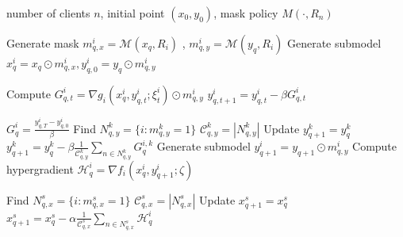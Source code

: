 \documentclass[lettersize,journal]{IEEEtran}
\begin{document}
\begin{algorithm}[t]
  \caption{Recourse-Adaptive Distributed Stochastic Bilevel Optimization(RABO)}
  \label{alg:rabo} 
  \begin{algorithmic}[1]
     number of clients $n$, initial point $(x_0, y_0)$, mask policy ${M}(\cdot, R_n)$

    \STATE \begin{small}Generate mask $ m^i_{q,x}=\mathcal{M}(x_{q},R_i)$ , $m^i_{q,y}=\mathcal{M}(y_{q}, R_i)$
    \STATE Generate submodel $ x^i_{q}=x_{q}\odot m^i_{q,x}, y^i_{q,0}=y_{q}\odot m^i_{q,y}$\end{small}

    \STATE Compute $G_{q,t}^i=\nabla g_i(x^i_{q}, y^i_{q,t};\xi_{t}^{i})\odot m^i_{q,y}$
    \STATE $y^i_{q,t+1}=y^i_{q,t}-\beta G_{q,t}^i$
    \ENDFOR
    
    \STATE $G_{q}^i=\frac{y^i_{q,T}-y^i_{q,0}}{\beta}$
    \ENDFOR
    \STATE Find $N_{q,y}^{k}=\{i:m_{q,y}^k=1\}$
    \STATE $\mathcal{C}_{q,y}^{k}=|N_{q,y}^{k}|$
    \STATE Update $y_{q+1}^k= y_{q}^k$
    \ELSE
    \STATE $y_{q+1}^k = y_{q}^k-\beta\frac{1}{\mathcal{C}_{q,y}^{k}} \sum_{n\in N_{q,y}^{k}}G_{q}^{i,k}$
    \ENDIF
    \ENDFOR
    \STATE Generate submodel $y^i_{q+1}=y_{q+1}\odot m^i_{q,y}$
    \STATE \colorbox{cyan!30}{Compute hypergradient $\mathcal{H}_q^i=\nabla f_i(x_q^i, y_{q+1}^i;\zeta)$}
    
    \ENDFOR
    \STATE Find $N_{q,x}^{s}=\{i:m_{q,x}^s=1\}$
    \STATE $\mathcal{C}_{q,x}^{s}=|N_{q,x}^{s}|$
    \STATE Update $x_{q+1}^s= x_{q}^s$
    \ELSE
    \STATE $x_{q+1}^s = x_q^s- \alpha \frac{1}{\mathcal{C}_{q,x}^{s}} \sum_{n\in N_{q,x}^{s}} \mathcal{H}_q^i$
    \ENDIF
    \ENDFOR
    \ENDFOR
  \end{algorithmic}
\end{algorithm}
\end{document}
